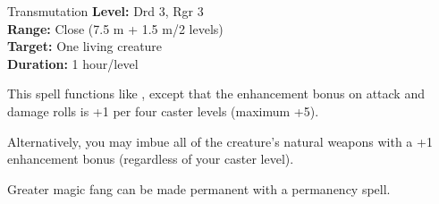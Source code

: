 {Transmutation}
{
	\textbf{Level:}
	Drd 3, Rgr 3\\
	\textbf{Range:}
	Close (7.5 m + 1.5 m/2 levels)\\
	\textbf{Target:}
	One living creature\\
	\textbf{Duration:}
	1 hour/level\\
}
{
	This spell functions like , except that the enhancement bonus on attack and damage rolls is +1 per four caster levels (maximum +5).

	Alternatively, you may imbue all of the creature's natural weapons with a +1 enhancement bonus (regardless of your caster level).

	Greater magic fang can be made permanent with a permanency spell.

}
